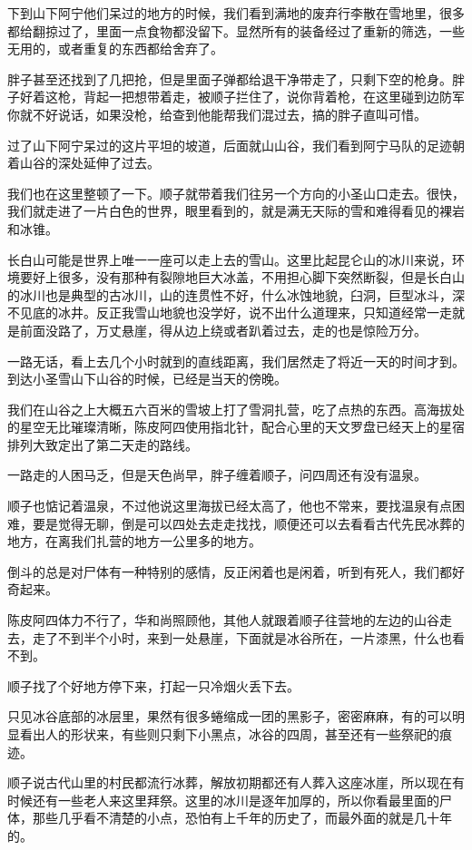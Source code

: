 下到山下阿宁他们呆过的地方的时候，我们看到满地的废弃行李散在雪地里，很多都给翻掠过了，里面一点食物都没留下。显然所有的装备经过了重新的筛选，一些无用的，或者重复的东西都给舍弃了。

胖子甚至还找到了几把抢，但是里面子弹都给退干净带走了，只剩下空的枪身。胖子好着这枪，背起一把想带着走，被顺子拦住了，说你背着枪，在这里碰到边防军你就不好说话，如果没枪，给查到他能帮我们混过去，搞的胖子直叫可惜。

过了山下阿宁呆过的这片平坦的坡道，后面就山山谷，我们看到阿宁马队的足迹朝着山谷的深处延伸了过去。

我们也在这里整顿了一下。顺子就带着我们往另一个方向的小圣山口走去。很快，我们就走进了一片白色的世界，眼里看到的，就是满无天际的雪和难得看见的裸岩和冰锥。

长白山可能是世界上唯一一座可以走上去的雪山。这里比起昆仑山的冰川来说，环境要好上很多，没有那种有裂隙地巨大冰盖，不用担心脚下突然断裂，但是长白山的冰川也是典型的古冰川，山的连贯性不好，什么冰蚀地貌，臼洞，巨型冰斗，深不见底的冰井。反正我雪山地貌也没学好，说不出什么道理来，只知道经常一走就是前面没路了，万丈悬崖，得从边上绕或者趴着过去，走的也是惊险万分。

一路无话，看上去几个小时就到的直线距离，我们居然走了将近一天的时间才到。到达小圣雪山下山谷的时候，已经是当天的傍晚。

我们在山谷之上大概五六百米的雪坡上打了雪洞扎营，吃了点热的东西。高海拔处的星空无比璀璨清晰，陈皮阿四使用指北针，配合心里的天文罗盘已经天上的星宿排列大致定出了第二天走的路线。

一路走的人困马乏，但是天色尚早，胖子缠着顺子，问四周还有没有温泉。

顺子也惦记着温泉，不过他说这里海拔已经太高了，他也不常来，要找温泉有点困难，要是觉得无聊，倒是可以四处去走走找找，顺便还可以去看看古代先民冰葬的地方，在离我们扎营的地方一公里多的地方。

倒斗的总是对尸体有一种特别的感情，反正闲着也是闲着，听到有死人，我们都好奇起来。

陈皮阿四体力不行了，华和尚照顾他，其他人就跟着顺子往营地的左边的山谷走去，走了不到半个小时，来到一处悬崖，下面就是冰谷所在，一片漆黑，什么也看不到。

顺子找了个好地方停下来，打起一只冷烟火丢下去。

只见冰谷底部的冰层里，果然有很多蜷缩成一团的黑影子，密密麻麻，有的可以明显看出人的形状来，有些则只剩下小黑点，冰谷的四周，甚至还有一些祭祀的痕迹。

顺子说古代山里的村民都流行冰葬，解放初期都还有人葬入这座冰崖，所以现在有时候还有一些老人来这里拜祭。这里的冰川是逐年加厚的，所以你看最里面的尸体，那些几乎看不清楚的小点，恐怕有上千年的历史了，而最外面的就是几十年的。

